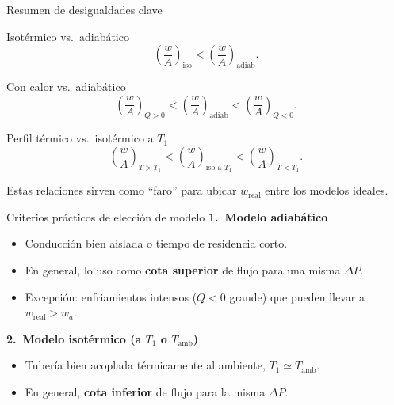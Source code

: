 \documentclass[aspectratio=169]{beamer}
\begin{document}

\begin{frame}{Resumen de desigualdades clave}
\begin{block}{Isotérmico vs.\ adiabático}
\[
\left(\frac{w}{A}\right)_{\text{iso}}
<
\left(\frac{w}{A}\right)_{\text{adiab}}.
\]
\end{block}

\pause

\begin{block}{Con calor vs.\ adiabático}
\[
\left(\frac{w}{A}\right)_{Q>0}
<
\left(\frac{w}{A}\right)_{\text{adiab}}
<
\left(\frac{w}{A}\right)_{Q<0}.
\]
\end{block}

\pause

\begin{block}{Perfil térmico vs.\ isotérmico a $T_1$}
\[
\left(\frac{w}{A}\right)_{T>T_1}
<
\left(\frac{w}{A}\right)_{\text{iso a }T_1}
<
\left(\frac{w}{A}\right)_{T<T_1}.
\]
\end{block}

Estas relaciones sirven como ``faro'' para ubicar $w_{\text{real}}$ entre los modelos ideales.
\end{frame}


\begin{frame}{Criterios prácticos de elección de modelo}
\textbf{1.\ Modelo adiabático}
\begin{itemize}
  \item Conducción bien aislada o tiempo de residencia corto.
  \item En general, lo uso como \textbf{cota superior} de flujo para una misma $\Delta P$.
  \item Excepción: enfriamientos intensos ($Q<0$ grande) que pueden llevar a $w_{\text{real}} > w_a$.
\end{itemize}

\pause

\textbf{2.\ Modelo isotérmico (a $T_1$ o $T_{\text{amb}}$)}
\begin{itemize}
  \item Tubería bien acoplada térmicamente al ambiente,
        $T_1 \simeq T_{\text{amb}}$.
  \item En general, \textbf{cota inferior} de flujo para la misma $\Delta P$.
\end{itemize}
\end{frame}
\end{document}
